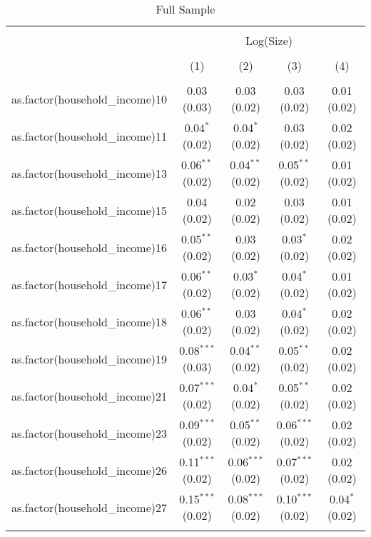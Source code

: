 
\begin{table}[!htbp] \centering 
  \caption{Full Sample} 
  \label{tab:packageSizeFullTamponappendix} 
\begin{tabular}{@{\extracolsep{5pt}}lcccc} 
\\[-1.8ex]\hline 
\hline \\[-1.8ex] 
 & \multicolumn{4}{c}{Log(Size)} \\ 
\\[-1.8ex] & (1) & (2) & (3) & (4)\\ 
\hline \\[-1.8ex] 
 as.factor(household\_income)10 & 0.03 (0.03) & 0.03 (0.02) & 0.03 (0.02) & 0.01 (0.02) \\ 
  as.factor(household\_income)11 & 0.04$^{*}$ (0.02) & 0.04$^{*}$ (0.02) & 0.03 (0.02) & 0.02 (0.02) \\ 
  as.factor(household\_income)13 & 0.06$^{**}$ (0.02) & 0.04$^{**}$ (0.02) & 0.05$^{**}$ (0.02) & 0.01 (0.02) \\ 
  as.factor(household\_income)15 & 0.04 (0.02) & 0.02 (0.02) & 0.03 (0.02) & 0.01 (0.02) \\ 
  as.factor(household\_income)16 & 0.05$^{**}$ (0.02) & 0.03 (0.02) & 0.03$^{*}$ (0.02) & 0.02 (0.02) \\ 
  as.factor(household\_income)17 & 0.06$^{**}$ (0.02) & 0.03$^{*}$ (0.02) & 0.04$^{*}$ (0.02) & 0.01 (0.02) \\ 
  as.factor(household\_income)18 & 0.06$^{**}$ (0.02) & 0.03 (0.02) & 0.04$^{*}$ (0.02) & 0.02 (0.02) \\ 
  as.factor(household\_income)19 & 0.08$^{***}$ (0.03) & 0.04$^{**}$ (0.02) & 0.05$^{**}$ (0.02) & 0.02 (0.02) \\ 
  as.factor(household\_income)21 & 0.07$^{***}$ (0.02) & 0.04$^{*}$ (0.02) & 0.05$^{**}$ (0.02) & 0.02 (0.02) \\ 
  as.factor(household\_income)23 & 0.09$^{***}$ (0.02) & 0.05$^{**}$ (0.02) & 0.06$^{***}$ (0.02) & 0.02 (0.02) \\ 
  as.factor(household\_income)26 & 0.11$^{***}$ (0.02) & 0.06$^{***}$ (0.02) & 0.07$^{***}$ (0.02) & 0.02 (0.02) \\ 
  as.factor(household\_income)27 & 0.15$^{***}$ (0.02) & 0.08$^{***}$ (0.02) & 0.10$^{***}$ (0.02) & 0.04$^{*}$ (0.02) \\ 
 \hline \\[-1.8ex] 

\end{tabular}
\end{table}
